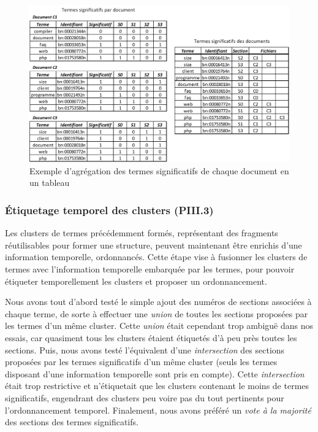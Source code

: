 \begin{figure}[ht]
\centering
\centerline{  %
\includegraphics[scale=0.85]{5-Conclusion/images/3-analyse-temporelle/exemple_tableau_termes_significatifs.png}
}
\caption{Exemple d'agrégation des termes significatifs de chaque document en un tableau}
\label{figure:5-III-2-ExempleTableauTermesSignificatifs}
\end{figure}

\vfill
\hspace{0pt}

\newpage

\subsubsection{Étiquetage temporel des clusters (PIII.3)}
\label{subsubsection:Conclusion:PerspectivesAmeliorations:AnalyseTemporelle:EtiquetageTemporelClusters}

Les clusters de termes précédemment formés, représentant des fragments réutilisables pour former une structure, peuvent maintenant être enrichis d'une information temporelle, ordonnancés.
Cette étape vise à fusionner les clusters de termes avec l'information temporelle embarquée par les termes, pour pouvoir étiqueter temporellement les clusters et proposer un ordonnancement.

\bigskip

Nous avons tout d'abord testé le simple ajout des numéros de sections associées à chaque terme, de sorte à effectuer une \textit{union} de toutes les sections proposées par les termes d'un même cluster.
Cette \textit{union} était cependant trop ambiguë dans nos essais, car quasiment tous les clusters étaient étiquetés d'à peu près toutes les sections.
Puis, nous avons testé l'équivalent d'une \textit{intersection} des sections proposées par les termes significatifs d'un même cluster (seuls les termes disposant d'une information temporelle sont pris en compte).
Cette \textit{intersection} était trop restrictive et n'étiquetait que les clusters contenant le moins de termes significatifs, engendrant des clusters peu voire pas du tout pertinents pour l'ordonnancement temporel.
Finalement, nous avons préféré un \textit{vote à la majorité} des sections des termes significatifs.

